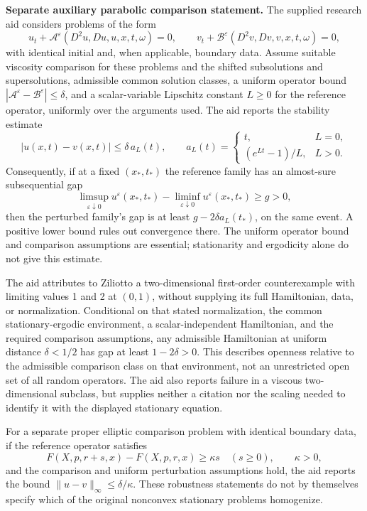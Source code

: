 \documentclass[11pt]{article}
\begin{document}
\textbf{Separate auxiliary parabolic comparison statement.} The supplied research aid considers problems of the form
\[
 u_t+\mathcal A^\varepsilon(D^2u,Du,u,x,t,\omega)=0,
 \qquad
 v_t+\mathcal B^\varepsilon(D^2v,Dv,v,x,t,\omega)=0,
\]
with identical initial and, when applicable, boundary data. Assume suitable viscosity comparison for these problems and the shifted subsolutions and supersolutions, admissible common solution classes, a uniform operator bound \(|\mathcal A^\varepsilon-\mathcal B^\varepsilon|\le\delta\), and a scalar-variable Lipschitz constant \(L\ge0\) for the reference operator, uniformly over the arguments used. The aid reports the stability estimate
\[
 |u(x,t)-v(x,t)|\le\delta\,a_L(t),\qquad
 a_L(t)=\begin{cases}t,&L=0,\\(e^{Lt}-1)/L,&L>0.\end{cases}
\]
Consequently, if at a fixed \((x_*,t_*)\) the reference family has an almost-sure subsequential gap
\[
 \limsup_{\varepsilon\downarrow0}u^\varepsilon(x_*,t_*)
 -\liminf_{\varepsilon\downarrow0}u^\varepsilon(x_*,t_*)\ge g>0,
\]
then the perturbed family's gap is at least \(g-2\delta a_L(t_*)\), on the same event. A positive lower bound rules out convergence there. The uniform operator bound and comparison assumptions are essential; stationarity and ergodicity alone do not give this estimate.

The aid attributes to Ziliotto a two-dimensional first-order counterexample with limiting values 1 and 2 at \((0,1)\), without supplying its full Hamiltonian, data, or normalization. Conditional on that stated normalization, the common stationary-ergodic environment, a scalar-independent Hamiltonian, and the required comparison assumptions, any admissible Hamiltonian at uniform distance \(\delta<1/2\) has gap at least \(1-2\delta>0\). This describes openness relative to the admissible comparison class on that environment, not an unrestricted open set of all random operators. The aid also reports failure in a viscous two-dimensional subclass, but supplies neither a citation nor the scaling needed to identify it with the displayed stationary equation.

For a separate proper elliptic comparison problem with identical boundary data, if the reference operator satisfies
\[
 F(X,p,r+s,x)-F(X,p,r,x)\ge\kappa s
 \quad(s\ge0),\qquad\kappa>0,
\]
and the comparison and uniform perturbation assumptions hold, the aid reports the bound \(\|u-v\|_\infty\le\delta/\kappa\). These robustness statements do not by themselves specify which of the original nonconvex stationary problems homogenize.
\end{document}
